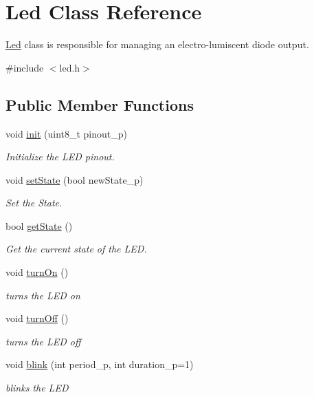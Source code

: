 \hypertarget{class_led}{}\section{Led Class Reference}
\label{class_led}


\hyperlink{class_led}{Led} class is responsible for managing an electro-\/lumiscent diode output.  




{\ttfamily \#include $<$led.\+h$>$}

\subsection*{Public Member Functions}
\begin{DoxyCompactItemize}
\item 
void \hyperlink{class_led_a4bce8445a80436df1126471f83b0fb17}{init} (uint8\+\_\+t pinout\+\_\+p)
\begin{DoxyCompactList}\small\item\em Initialize the L\+ED pinout. \end{DoxyCompactList}\item 
void \hyperlink{class_led_a9136de456f7df8e202e880312767a566}{set\+State} (bool new\+State\+\_\+p)
\begin{DoxyCompactList}\small\item\em Set the State. \end{DoxyCompactList}\item 
bool \hyperlink{class_led_a3c98242eb57df713fcb8d441d43ccd02}{get\+State} ()
\begin{DoxyCompactList}\small\item\em Get the current state of the L\+ED. \end{DoxyCompactList}\item 
\mbox{\label{class_led_a02561ef42927779f247c0ae714a89e9a}} 
void \hyperlink{class_led_a02561ef42927779f247c0ae714a89e9a}{turn\+On} ()
\begin{DoxyCompactList}\small\item\em turns the L\+ED on \end{DoxyCompactList}\item 
\mbox{\label{class_led_a3c581311221a0fedafdfb250a1f318ab}} 
void \hyperlink{class_led_a3c581311221a0fedafdfb250a1f318ab}{turn\+Off} ()
\begin{DoxyCompactList}\small\item\em turns the L\+ED off \end{DoxyCompactList}\item 
void \hyperlink{class_led_a5ffc6040a68800545f1d063641cad66d}{blink} (int period\+\_\+p, int duration\+\_\+p=1)
\begin{DoxyCompactList}\small\item\em blinks the L\+ED \end{DoxyCompactList}\end{DoxyCompactItemize}


